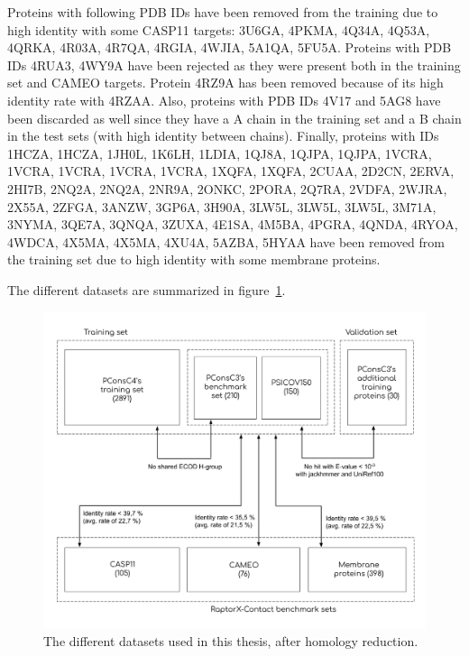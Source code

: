     Proteins with following PDB IDs have been removed from the training due to high
    identity with some CASP11 targets: 3U6GA, 4PKMA, 4Q34A, 4Q53A, 4QRKA, 4R03A, 4R7QA,
    4RGIA, 4WJIA, 5A1QA, 5FU5A.
    Proteins with PDB IDs 4RUA3, 4WY9A have been rejected as they were present
    both in the training set and CAMEO targets. Protein 4RZ9A has been removed
    because of its high identity rate with 4RZAA.
    Also, proteins with PDB IDs 4V17 and 5AG8 have been discarded as well
    since they have a A chain in the training set and a B chain in the test sets (with high identity
    between chains). Finally, proteins with IDs 1HCZA, 1HCZA, 1JH0L, 1K6LH, 1LDIA, 1QJ8A, 1QJPA, 1QJPA,
    1VCRA, 1VCRA, 1VCRA, 1VCRA, 1VCRA, 1XQFA, 1XQFA, 2CUAA, 2D2CN, 2ERVA, 2HI7B, 2NQ2A, 2NQ2A, 2NR9A, 2ONKC, 2PORA,
    2Q7RA, 2VDFA, 2WJRA, 2X55A, 2ZFGA, 3ANZW, 3GP6A, 3H90A, 3LW5L, 3LW5L, 3LW5L, 3M71A, 3NYMA, 3QE7A, 3QNQA, 3ZUXA,
    4E1SA, 4M5BA, 4PGRA, 4QNDA, 4RYOA, 4WDCA, 4X5MA, 4X5MA, 4XU4A, 5AZBA, 5HYAA have been removed from the training
    set due to high identity with some membrane proteins.

    The different datasets are summarized in figure~\ref{homology_reduction}.

    \begin{figure}[H]
      \begin{center}
        \includegraphics[width=\textwidth, keepaspectratio]{imgs/datasets.png}
         \caption{The different datasets used in this thesis, after homology reduction.}
        \label{homology_reduction}
      \end{center}
    \end{figure}

